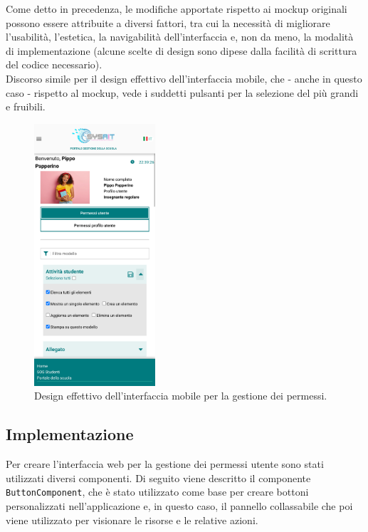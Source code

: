 \documentclass[a4paper, 12pt]{book}
\begin{document}
Come detto in precedenza, le modifiche apportate rispetto ai mockup originali possono essere attribuite a diversi fattori,
tra cui la necessità di migliorare l'usabilità, l'estetica, la navigabilità dell'interfaccia e, non da meno, la modalità
di implementazione (alcune scelte di design sono dipese dalla facilità di scrittura del codice necessario).\\

Discorso simile per il design effettivo dell'interfaccia mobile, che - anche in questo caso -
rispetto al mockup, vede i suddetti pulsanti per la selezione del più grandi e fruibili.

\begin{figure}[H]
  \centering
  \includegraphics[width=0.4\textwidth]{../images/permission-management-mobile.png}
  \caption{Design effettivo dell'interfaccia mobile per la gestione dei permessi.}
  \label{fig:final-mobile}
\end{figure}

\newpage

\subsection{Implementazione}

Per creare l'interfaccia web per la gestione dei permessi utente sono stati utilizzati diversi componenti.
Di seguito viene descritto il componente \texttt{ButtonComponent}, che è stato utilizzato come base per creare bottoni
personalizzati nell'applicazione e, in questo caso, il pannello collassabile che poi viene utilizzato per visionare
le risorse e le relative azioni.\\
\end{document}
